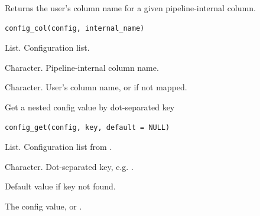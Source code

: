 \documentclass[a4paper]{book}
\begin{document}
%
\begin{Description}
Returns the user's column name for a given pipeline-internal column.
\end{Description}
%
\begin{Usage}
\begin{verbatim}
config_col(config, internal_name)
\end{verbatim}
\end{Usage}
%
\begin{Arguments}
\begin{ldescription}
\item[\code{config}] List. Configuration list.

\item[\code{internal\_name}] Character. Pipeline-internal column name.
\end{ldescription}
\end{Arguments}
%
\begin{Value}
Character. User's column name, or  if not mapped.
\end{Value}
%
\begin{Description}
Get a nested config value by dot-separated key
\end{Description}
%
\begin{Usage}
\begin{verbatim}
config_get(config, key, default = NULL)
\end{verbatim}
\end{Usage}
%
\begin{Arguments}
\begin{ldescription}
\item[\code{config}] List. Configuration list from .

\item[\code{key}] Character. Dot-separated key, e.g. .

\item[\code{default}] Default value if key not found.
\end{ldescription}
\end{Arguments}
%
\begin{Value}
The config value, or .
\end{Value}
\end{document}
